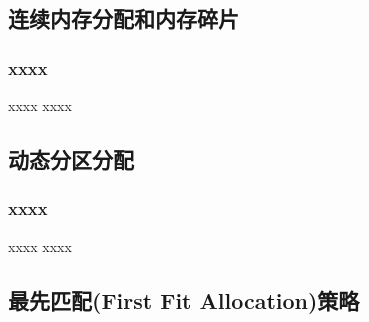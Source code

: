 \subsection{连续内存分配和内存碎片} %

\begin{frame}[plain,t]
    
    \frametitle{xxxx}
    
    
    \begin{block}{xxxx}
        xxxx

    \end{block} 
    
    
    \begin{figure}
        \centering
    \end{figure}
    
\end{frame}

\subsection{动态分区分配} %

\begin{frame}[plain,t]
    
    \frametitle{xxxx}
    
    
    \begin{block}{xxxx}
        xxxx

    \end{block} 
    
    
    \begin{figure}
        \centering
    \end{figure}
    
\end{frame}
\subsection{最先匹配(First Fit Allocation)策略} %

